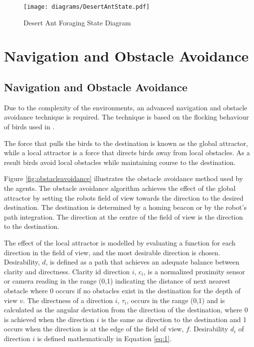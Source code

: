 \begin{figure}[h]
	\centering
	\texttt{[image: diagrams/DesertAntState.pdf]}
	\caption{Desert Ant Foraging State Diagram}
	\label{fig:desertantstate}
\end{figure}
	

\section{Navigation and Obstacle Avoidance}
\label{thri:third:obstacleavoidance}

\subsection{Navigation and Obstacle Avoidance}
Due to the complexity of the environments, an advanced navigation and obstacle avoidance technique is required.  The technique is based on the flocking behaviour of birds used in \cite{antoniou2012congestion}.

The force that pulls the birds to the destination is known as the global attractor, while a local attractor is a force that directs birds away from local obstacles. As a result birds avoid local obstacles while maintaining course to the destination. 

Figure \ref{fig:obstacleavoidance} illustrates the obstacle avoidance method used by the agents. The obstacle avoidance algorithm achieves the effect of the global attractor by setting the robots field of view towards the direction to the desired destination. The destination is determined by a homing beacon or by the robot's path integration. The direction at the centre of the field of view is the direction to the destination. 

The effect of the local attractor is modelled by evaluating a function for each direction in the field of view, and the most desirable direction is chosen. Desirability, $d$, is defined as a path that achieves an adequate balance between clarity and directness. Clarity id direction $i$, $c_i$, is a normalized proximity sensor or camera reading in the range (0,1) indicating the distance of next nearest obstacle where 0 occurs if no obstacles exist in the destination for the depth of view $v$. The directness of a direction $i$, $\tau_i$, occurs in the range (0,1) and is calculated as the angular deviation from the direction of the destination, where 0 is achieved when the direction $i$ is the same as direction to the destination and 1 occurs when the direction is at the edge of the field of view, $f$. Desirability $d_i$ of direction $i$ is defined mathematically in Equation \ref{eq:1}.

